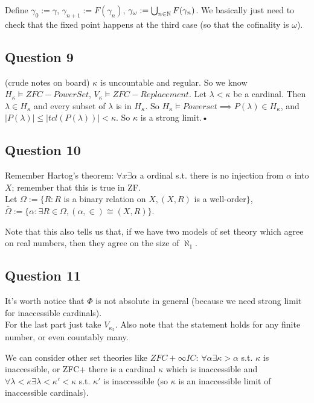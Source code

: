 \documentclass[a4paper]{article}
\begin{document}
Define $\gamma_0 := \gamma$, $\gamma_{n+1} := F(\gamma_n)$, $\gamma_\omega := \bigcup_{n \in \mathbb{N}} F(\gamma_n)$. We basically just need to check that the fixed point happens at the third case (so that the cofinality is $\omega$).

\subsection{Question 9}
(crude notes on board) $\kappa$ is uncountable and regular. So we know $H_\kappa \vDash ZFC-PowerSet$, $V_\kappa \vDash ZFC-Replacement$. Let $\lambda < \kappa$ be a cardinal. Then $\lambda \in H_\kappa$ and every subset of $\lambda$ is in $H_\kappa$. So $H_\kappa \vDash Powerset \implies P(\lambda) \in H_\kappa$, and $|P(\lambda)| \leq |tcl(P(\lambda))| < \kappa$. So $\kappa$ is a strong limit.•

\subsection{Question 10}

Remember Hartog's theorem: $\forall x \exists \alpha$ a ordinal s.t. there is no injection from $\alpha$ into $X$; remember that this is true in ZF.\\
Let $\Omega := \{R: R$ is a binary relation on $X, (X,R)$ is a well-order$\}$,\\
$\bar{\Omega} := \{\alpha: \exists R \in \Omega, (\alpha,\in)\cong (X,R)\}$.

Note that this also tells us that, if we have two models of set theory which agree on real numbers, then they agree on the size of $\aleph_1$.

\subsection{Question 11}
It's worth notice that $\Phi$ is not absolute in general (because we need strong limit for inaccessible cardinals).\\
For the last part just take $V_{\kappa_2}$. Also note that the statement holds for any finite number, or even countably many.

We can consider other set theories like $ZFC+\infty IC$: $\forall \alpha \exists \kappa > \alpha$ s.t. $\kappa$ is inaccessible, or ZFC+ there is a cardinal $\kappa$ which is inaccessible and $\forall \lambda < \kappa \exists \lambda < \kappa' < \kappa$ s.t. $\kappa'$ is inaccessible (so $\kappa$ is an inaccessible limit of inaccessible cardinals).
\end{document}
